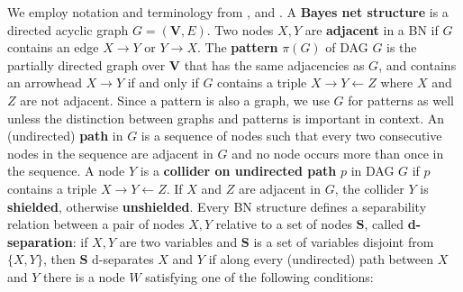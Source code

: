\documentclass{elsarticle}%
\newcommand{\V}{\mathbf{V}}
\renewcommand{\S}{\mathbf{{S}}}
\newcommand{\X}{X}
\newcommand{\Y}{Y}
\newcommand{\Z}{Z}
\newcommand{\G}{G}
\def\seq#1{\langle#1\rangle} %
\begin{document}
We employ notation and terminology from \cite{pearl00:_causal}, \cite{pearl88:_probab_reason_intel_system} and
\cite{peter00:_causat}. 
A {\bf Bayes net structure} is a directed
acyclic graph %
$G = (\V, E)$. 
Two nodes $X,Y$ are {\bf adjacent} in a BN if $G$ contains an edge $X \rightarrow Y$ or $Y \rightarrow X$. 
The {\bf pattern} $\pi(G)$ of DAG $G$ is
the partially directed graph over $\V$ that has the same adjacencies as $G$,
and contains an arrowhead $X \rightarrow Y$ if and only if $G$ contains a
triple $X \rightarrow Y \leftarrow Z$ where $X$ and $Z$ are not adjacent. Since a pattern is also a graph, we use $\G$ for patterns as well  unless the distinction between graphs and patterns is important in context. %
An (undirected) \textbf{path} in $G$ is a sequence of nodes such that every two consecutive
nodes in the sequence are adjacent in $G$ and no node occurs more than once in the sequence.
A node $\Y$ is a {\bf collider on undirected path} $p$ in DAG $G$ if $p$ contains a triple $\X \rightarrow \Y \leftarrow \Z$. If $\X$ and $\Z$ are adjacent in $\G$, the collider $\Y$ is \textbf{shielded}, otherwise \textbf{unshielded}. 
Every BN structure defines a %
separability relation
between a pair of nodes $X,Y$ relative to a set of nodes $\S$,
called {\bf d-separation}: %
if $X,Y$ are two variables and $\S$ is a set of variables disjoint from
$\{X,Y\}$, then $\mathbf{S}$ d-separates $X$ and $Y$ if along every (undirected) path
between $X$ and $Y$ there is a node $W$ satisfying one of the following
conditions:
\end{document}
